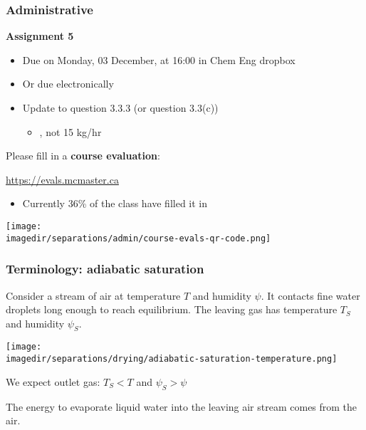 \begin{frame}\frametitle{Administrative}
	\textbf{Assignment 5}
	\begin{itemize}
		\item	Due on Monday, 03 December, at 16:00 in Chem Eng dropbox
		\item	Or due electronically
		\item	Update to question 3.3.3 (or question 3.3(c))
			\begin{itemize}
				\item	{\color{myRed}{Solvent flow, $S = 27.5$ kg/hr}}, not 15 kg/hr
			\end{itemize}
	\end{itemize}
	\vspace{12pt}
	Please fill in a \textbf{course evaluation}:
	\begin{exampleblock}{}
		\begin{center}
			\href{https://evals.mcmaster.ca}{https://evals.mcmaster.ca}
		\end{center}
	\end{exampleblock}
	\begin{itemize}
		\item	Currently 36\% of the class have filled it in
	\end{itemize}
	\begin{center}
		\texttt{[image: \\imagedir/separations/admin/course-evals-qr-code.png]}
	\end{center}
\end{frame}

\begin{frame}\frametitle{Terminology: adiabatic saturation}
	Consider a stream of air at temperature $T$ and humidity $\psi$. It contacts fine water droplets long enough to reach equilibrium. The leaving gas has temperature $T_S$ and humidity $\psi_S$.

	\begin{center}
		\texttt{[image: \\imagedir/separations/drying/adiabatic-saturation-temperature.png]}
	\end{center}

	We expect outlet gas: $T_S < T$ and $\psi_S > \psi$
	
	\vspace{6pt}
	The energy to evaporate liquid water into the leaving air stream comes from the air.
\end{frame}

